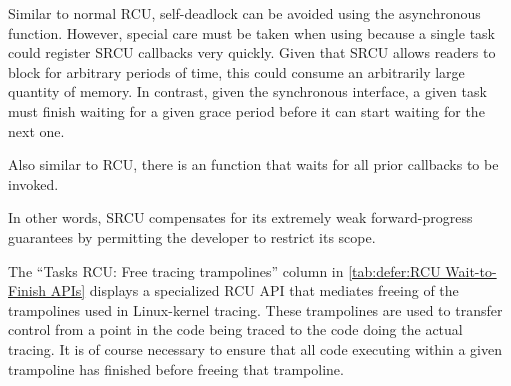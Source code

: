 \QuickQuizEnd

Similar to normal RCU, self-deadlock can be avoided using the
asynchronous  function.
However, special care must be taken when using  because
a single task could register SRCU callbacks very quickly.
Given that SRCU allows readers to block for arbitrary periods of
time, this could consume an arbitrarily large quantity of memory.
In contrast, given the synchronous 
interface, a given task must finish waiting for a given grace period
before it can start waiting for the next one.

Also similar to RCU, there is an  function that waits
for all prior  callbacks to be invoked.

In other words, SRCU compensates for its extremely weak
forward-progress guarantees by permitting the developer to restrict
its scope.

The ``Tasks RCU: Free tracing trampolines'' column in
\cref{tab:defer:RCU Wait-to-Finish APIs} displays a specialized
RCU API that mediates freeing of the trampolines used in Linux-kernel
tracing.
These trampolines are used to transfer control from a point in the
code being traced to the code doing the actual tracing.
It is of course necessary to ensure that all code executing within
a given trampoline has finished before freeing that trampoline.

